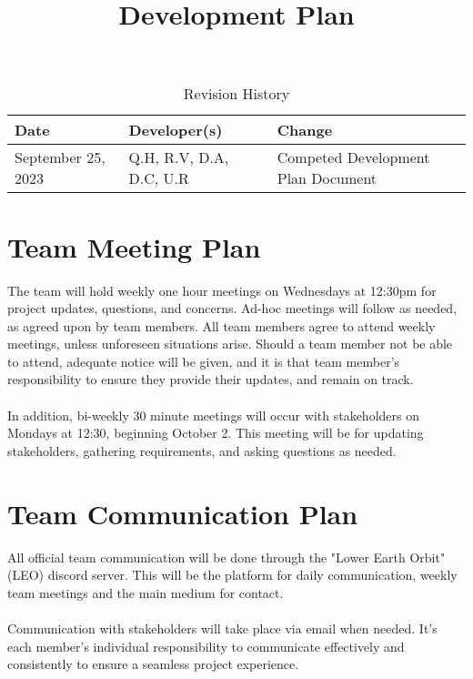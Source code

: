 \documentclass{article}
\title{Development Plan\\\progname}
\author{\authname}
\date{}
\begin{document}
\maketitle

\begin{table}[hp]
\caption{Revision History} \label{TblRevisionHistory}
\begin{tabularx}{\textwidth}{llX}
\toprule
\textbf{Date} & \textbf{Developer(s)} & \textbf{Change}\\
\midrule
September 25, 2023 & Q.H, R.V, D.A, D.C, U.R & Competed Development Plan Document\\
\bottomrule
\end{tabularx}
\end{table}


\section{Team Meeting Plan}
The team will hold weekly one hour meetings on Wednesdays at 12:30pm for project updates, questions, and concerns. Ad-hoc meetings will follow as needed, as agreed upon by team members. All team members agree to attend weekly meetings, unless unforeseen situations arise. Should a team member not be able to attend, adequate notice will be given, and it is that team member’s responsibility to ensure they provide their updates, and remain on track.
\\ \\ 
In addition, bi-weekly 30 minute meetings will occur with stakeholders on Mondays at 12:30, beginning October 2. This meeting will be for updating stakeholders, gathering requirements, and asking questions as needed.


\section{Team Communication Plan}
All official team communication will be done through the "Lower Earth Orbit" (LEO) discord server. This will be the platform for daily communication, weekly team meetings and the main medium for contact. \\ \\
Communication with stakeholders will take place via email when needed. It's each member's individual responsibility to communicate effectively and consistently to ensure a seamless project experience.  
\end{document}
